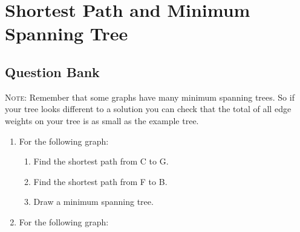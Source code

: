 \documentclass[a4paper,12pt]{article}
\begin{document}
\large
\section*{Shortest Path and Minimum Spanning Tree}

\subsection*{Question Bank}

\textsc{Note}: Remember that some graphs have many minimum spanning 
trees. So if your tree looks different to a solution you can check 
that the total of all edge weights on your tree is as small as 
the example tree. 

\begin{enumerate}
\item For the following graph:

    \begin{enumerate}
    \item Find the shortest path from C to G.
    \item Find the shortest path from F to B.
    \item Draw a minimum spanning tree.
    \end{enumerate}

\item For the following graph:


\end{enumerate}
\end{document}
